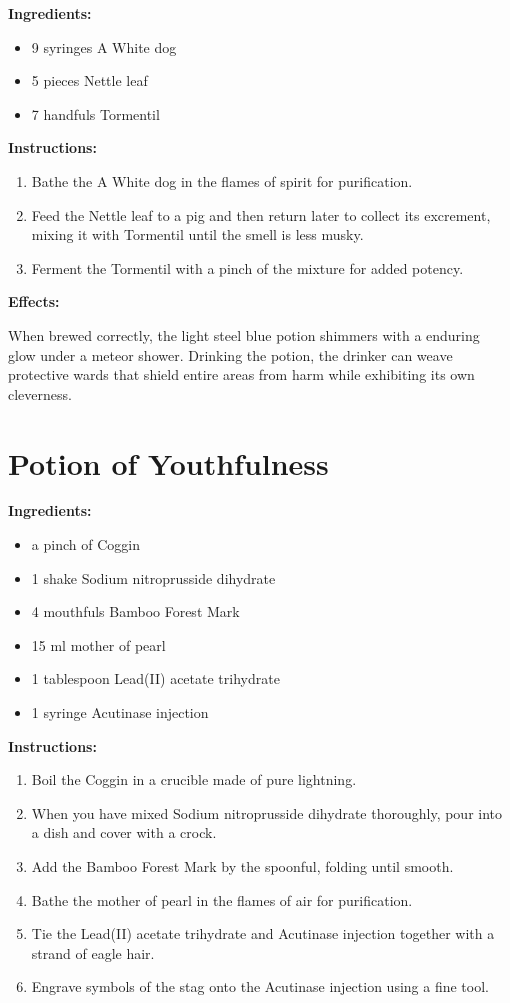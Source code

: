 \documentclass{article}
\begin{document}
\textbf{Ingredients:}

\begin{itemize}
  \item 9 syringes A White dog
  \item 5 pieces Nettle leaf
  \item 7 handfuls Tormentil
\end{itemize}

\textbf{Instructions:}

\begin{enumerate}
  \item Bathe the A White dog in the flames of spirit for purification.
  \item Feed the Nettle leaf to a pig and then return later to collect its excrement, mixing it with Tormentil until the smell is less musky.
  \item Ferment the Tormentil with a pinch of the mixture for added potency.
\end{enumerate}

\textbf{Effects:}

When brewed correctly, the light steel blue potion shimmers with a enduring glow under a meteor shower. Drinking the potion, the drinker can weave protective wards that shield entire areas from harm while exhibiting its own cleverness.

\newpage
\section*{Potion of Youthfulness}

\textbf{Ingredients:}

\begin{itemize}
  \item a pinch of Coggin
  \item 1 shake Sodium nitroprusside dihydrate
  \item 4 mouthfuls Bamboo Forest Mark
  \item 15 ml mother of pearl
  \item 1 tablespoon Lead(II) acetate trihydrate
  \item 1 syringe Acutinase injection
\end{itemize}

\textbf{Instructions:}

\begin{enumerate}
  \item Boil the Coggin in a crucible made of pure lightning.
  \item When you have mixed Sodium nitroprusside dihydrate thoroughly, pour into a dish and cover with a crock.
  \item Add the Bamboo Forest Mark by the spoonful, folding until smooth.
  \item Bathe the mother of pearl in the flames of air for purification.
  \item Tie the Lead(II) acetate trihydrate and Acutinase injection together with a strand of eagle hair.
  \item Engrave symbols of the stag onto the Acutinase injection using a fine tool.
\end{enumerate}
\end{document}
